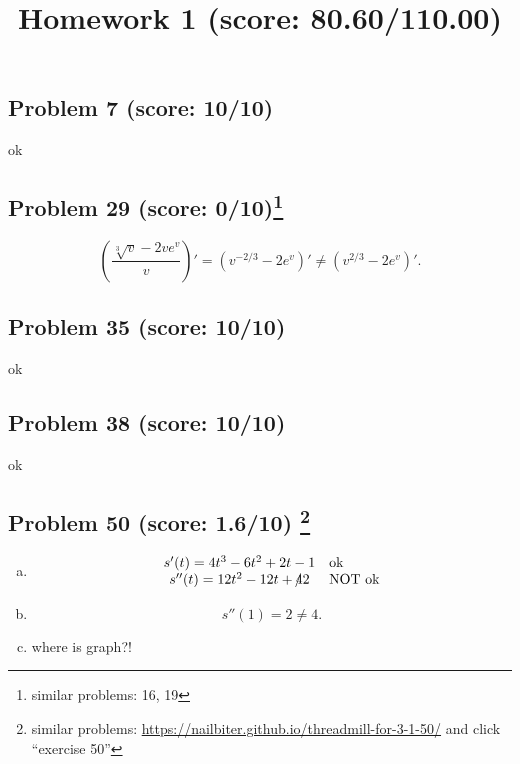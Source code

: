 \documentclass[10pt]{article} %
\title{Homework 1 (score: 80.60/110.00)}
\begin{document}
\maketitle

\subsection*{Problem 7 (score: 10/10)}
ok

\subsection*{Problem 29 (score: 0/10)\footnote{similar problems: 16, 19}}

\begin{equation*}
	\left(\frac{\sqrt[3]{v}-2ve^v}{v}  \right)'=\left( 
	v^{-2/3}-2e^v\right)'\neq \left( v^{2/3}-2e^v \right)'.
\end{equation*}

\subsection*{Problem 35 (score: 10/10)}
ok

\subsection*{Problem 38 (score: 10/10)}
ok

\subsection*{Problem 50 (score: 1.6/10) \footnote{similar problems: \url{https://nailbiter.github.io/threadmill-for-3-1-50/} and click ``exercise 50''}}
\begin{enumerate}[(a)]
	\item 
\begin{equation*}
	\begin{array}[]{cl}
		s'(t)=4t^3-6t^2+2t-1&\mbox{ok}\\
		s''(t)=12t^2-12t+\mbox{\xout{4}}2&\mbox{NOT ok}\\
	\end{array}
\end{equation*}
\item
	\begin{equation*}
		s''(1)=2\neq4.
	\end{equation*}
\item 
	where is graph?!
\end{enumerate}
\end{document}
